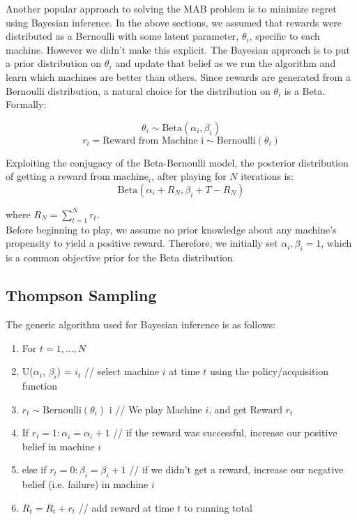 \documentclass{article}
\begin{document}
Another popular approach to solving the MAB problem is to minimize regret using Bayesian inference. In the above sections, we assumed that rewards were distributed as a Bernoulli with some latent parameter, $\theta_i$, specific to each machine. However we didn't make this explicit. The Bayesian approach is to put a prior distribution on $\theta_i$ and update that belief as we run the algorithm and learn which machines are better than others. Since rewards are generated from a Bernoulli distribution, a natural choice for the distribution on $\theta_i$ is a Beta. Formally:

$$\theta_i \sim \text{Beta}(\alpha_i, \beta_i)$$
$$r_i = \text{Reward from Machine i} \sim \text{Bernoulli}(\theta_i)$$

Exploiting the conjugacy of the Beta-Bernoulli model, the posterior distribution of getting a reward from $\text{machine}_i$, after playing for $N$ iterations is:
$$\text{Beta}(\alpha_i + R_{N}, \beta_i + T - R_{N})$$

where $R_{N} = \sum_{t=1}^{N}r_{t}$.\\

Before beginning to play, we assume no prior knowledge about any machine's propensity to yield a positive reward. Therefore, we initially set $\alpha_i, \beta_i = 1$, which is a common objective prior for the Beta distribution.\\

\subsection{Thompson Sampling}

The generic algorithm used for Bayesian inference is as follows:

\begin{enumerate}
\item For $t = 1, ..., N$
\item U($\alpha_i$, $\beta_i$) = $i_t$  // select machine $i$ at time $t$ using the policy/acquisition function
\item $r_t \sim \text{Bernoulli}(\theta_{i})$  i  // We play Machine $i$, and get Reward $r_t$
\item If $r_t = 1: \alpha_i = \alpha_i + 1$   // if the reward was successful, increase our positive belief in machine $i$
\item else if $r_t = 0: \beta_i = \beta_i + 1$  // if we didn't get a reward, increase our negative belief (i.e. failure) in machine $i$
\item $R_t = R_t + r_t$		// add reward at time $t$ to running total
\end{enumerate}
\end{document}
